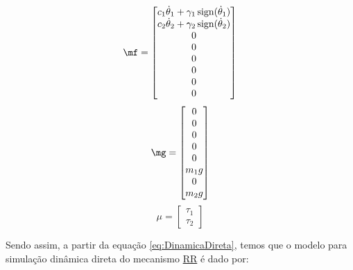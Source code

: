\documentclass[a4paper,11pt,brazil,fleqn]{article}
\begin{document}
\begin{itemize}
\begin{equation}
\mf =
\begin{bmatrix}
c_1 \dot{\theta}_1 + \gamma_1 \sign (\dot{\theta}_1) \\
c_2 \dot{\theta}_2 + \gamma_2 \sign (\dot{\theta}_2) \\
0 \\
0 \\
0 \\
0 \\
0 \\
0 \\
\end{bmatrix}
\end{equation}
\begin{equation}
\mg =
\begin{bmatrix}
0 \\
0 \\
0 \\
0 \\
0 \\
m_1 g \\
0 \\
m_2 g
\end{bmatrix}
\end{equation}
\begin{equation}
\mu =
\begin{bmatrix}
\tau_1 \\
\tau_2
\end{bmatrix}
\end{equation}

\end{itemize}

Sendo assim, a partir da equa\c{c}\~ao \eqref{eq:DinamicaDireta}, temos que o modelo para simula\c{c}\~ao din\^amica direta do mecanismo \underline{R}\underline{R} \'e dado por:
\end{document}
